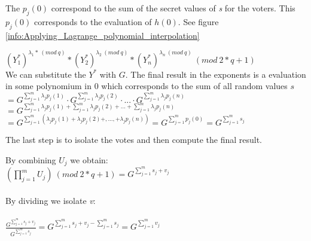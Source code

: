 \noindent
The \begin{math}p_j(0) \end{math} correspond to the sum of the secret values of \textit{s} for the voters. This \begin{math}p_j(0)\end{math} corresponds to the evaluation of \begin{math}h(0)\end{math}. See figure  \ref{info:Applying_Lagrange_polynomial_interpolation}

\begin{infobox}
\begin{math}(Y_1^*)^{\lambda_1 * \ (mod \ q)} * (Y_2^*)^{\lambda_2 \ (mod \ q)} * (Y_n^*)^{\lambda_n \ (mod \ q)} \ (mod \ 2*q+1) \end{math}\\


\noindent
We can substitute the $Y^*$ with $G$. The final result in the exponents is a evaluation in some polynomium in $0$ which corresponds to the sum of all random values $s$\\


\noindent
$=G^{ \sum\limits_{j=1}^m \lambda_j p_j(1)} \cdot G^{ \sum\limits_{j=1}^m \lambda_j p_j(2)} \cdot...\cdot G^{ \sum\limits_{j=1}^m \lambda_j p_j(n)} $\\
$=G^{ \sum\limits_{j=1}^m \lambda_j p_j(1) +  \sum\limits_{j=1}^m \lambda_j p_j(2) +...+  \sum\limits_{j=1}^m \lambda_j p_j(n)} $\\
$=G^{ \sum\limits_{j=1}^m (\lambda_j p_j(1)+\lambda_j p_j(2)+,...,+\lambda_{j}p_j(n))} = G^{ \sum\limits_{j=1}^m p_j(0)}= G^{ \sum\limits_{j=1}^m s_j}  $
\end{infobox}



\noindent
The last step is to isolate the votes and then compute the final result.


\noindent
\begin{infobox}
By combining \begin{math}U_j \end{math} we obtain: \\ 
\begin{math} (\prod\limits_{j=1}^{m} U_{j}) \ (mod \ 2*q+1)=  G^{ \sum\limits_{j=1}^m s_j +v_j}\end{math} \\ \\
By dividing we isolate \textit{v}: \\ \\
\begin{math}\frac{G^{ \sum\limits_{j=1}^m s_j +v_j}}{{ G^{ \sum\limits_{j=1}^m s_j} }} =G^{ \sum\limits_{j=1}^m s_j +v_j -\sum\limits_{j=1}^m s_j} = G^{ \sum\limits_{j=1}^m v_j}  \end{math}
\end{infobox}


